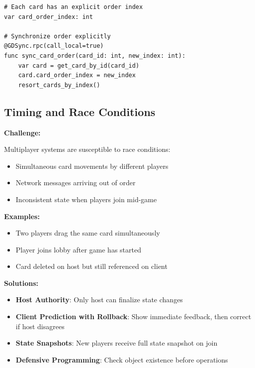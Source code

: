 \begin{lstlisting}[caption={Card order synchronization approach}]
# Each card has an explicit order index
var card_order_index: int

# Synchronize order explicitly
@GDSync.rpc(call_local=true)
func sync_card_order(card_id: int, new_index: int):
    var card = get_card_by_id(card_id)
    card.card_order_index = new_index
    resort_cards_by_index()
\end{lstlisting}

\subsection{Timing and Race Conditions}
\label{subsec:timing-issues}

\textbf{Challenge:}

Multiplayer systems are susceptible to race conditions:
\begin{itemize}
    \item Simultaneous card movements by different players
    \item Network messages arriving out of order
    \item Inconsistent state when players join mid-game
\end{itemize}

\textbf{Examples:}

\begin{itemize}
    \item Two players drag the same card simultaneously
    \item Player joins lobby after game has started
    \item Card deleted on host but still referenced on client
\end{itemize}

\textbf{Solutions:}

\begin{itemize}
    \item \textbf{Host Authority}: Only host can finalize state changes
    \item \textbf{Client Prediction with Rollback}: Show immediate feedback, then correct if host disagrees
    \item \textbf{State Snapshots}: New players receive full state snapshot on join
    \item \textbf{Defensive Programming}: Check object existence before operations
\end{itemize}

